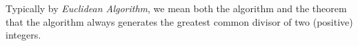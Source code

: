 \documentclass{ximera}
\begin{document}
			

					




Typically by \emph{Euclidean Algorithm}, we mean  both the algorithm and the theorem that the algorithm always generates the greatest common divisor of two (positive) integers.
\end{document}
